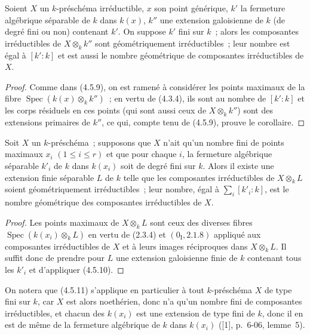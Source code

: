 \begin{corollary}[4.5.10]
\label{IV.2.4.5.10-fr}
Soient $X$ un $k$-préschéma irréductible, $x$ son point générique, $k'$ la
fermeture algébrique séparable de $k$ dans $k(x)$, $k''$ une extension
galoisienne de $k$ (de degré fini ou non) contenant $k'$. On suppose $k'$ fini
sur $k$~; alors les composantes irréductibles de $X\otimes_k k''$ sont
géométriquement irréductibles~; leur nombre est égal à $[k':k]$ et est aussi le
nombre géométrique de composantes irréductibles de $X$.
\end{corollary}

\begin{proof}
Comme dans (4.5.9), on est ramené à considérer les points maximaux de la fibre
$\operatorname{Spec}(k(x)\otimes_k k'')$~; en vertu de (4.3.4), ils sont au
nombre de $[k':k]$ et les corps résiduels en ces points (qui sont aussi ceux de
$X\otimes_k k''$) sont des extensions primaires de $k''$, ce qui, compte tenu
de (4.5.9), prouve le corollaire.
\end{proof}

\begin{corollary}[4.5.11]
\label{IV.2.4.5.11-fr}
Soit $X$ un $k$-préschéma~; supposons que $X$ n'ait qu'un nombre fini de
points maximaux $x_i$ $(1\leqslant i\leqslant r)$ et que pour chaque $i$, la
fermeture algébrique séparable $k'_i$ de $k$ dans $k(x_i)$ soit de degré fini
sur $k$. Alors il existe une extension finie séparable $L$ de $k$ telle que les
composantes irréductibles de $X\otimes_k L$ soient géométriquement
irréductibles~; leur nombre, égal à $\sum_i[k'_i:k]$, est le nombre géométrique
des composantes irréductibles de $X$.
\end{corollary}

\begin{proof}
Les points maximaux de $X\otimes_k L$ sont ceux des diverses fibres
$\operatorname{Spec}(k(x_i)\otimes_k L)$ en vertu de (2.3.4) et
$(0_{\mathrm I},2.1.8)$ appliqué aux composantes irréductibles de $X$ et à
leurs images réciproques dans $X\otimes_k L$. Il suffit donc de prendre pour
$L$ une extension galoisienne finie de $k$ contenant tous les $k'_i$ et
d'appliquer (4.5.10).
\end{proof}

On notera que (4.5.11) s'applique en particulier à tout $k$-préschéma $X$ de
type fini sur $k$, car $X$ est alors noethérien, donc n'a qu'un nombre fini de
composantes irréductibles, et chacun des $k(x_i)$ est une extension de type
fini de $k$, donc il en est de même de la fermeture algébrique de $k$ dans
$k(x_i)$ ([1], p.~6-06, lemme~5).

